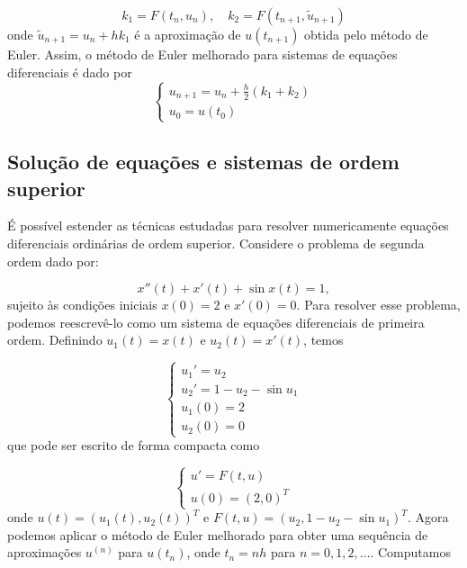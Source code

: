 \documentclass{article}
\begin{document}
\begin{equation}
    k_1 = F(t_n, u_n), \quad k_2 = F(t_{n+1}, \tilde{u}_{n+1})
\end{equation}
onde \(\tilde{u}_{n+1} = u_n + hk_1\) é a aproximação de \(u(t_{n+1})\) obtida pelo método de Euler. Assim, o método de Euler melhorado para sistemas de equações diferenciais é dado por
\begin{equation}
    \begin{cases}
        u_{n+1} = u_n + \frac{h}{2} (k_1 + k_2) \\
        u_0 = u(t_0)
    \end{cases}
\end{equation}

\subsection{Solução de equações e sistemas de ordem superior}

É possível estender as técnicas estudadas para resolver numericamente equações diferenciais ordinárias de ordem superior. Considere o problema de segunda ordem dado por:

\begin{equation}
    x''(t) + x'(t) + \sin x(t) = 1,
\end{equation}
sujeito às condições iniciais \(x(0) = 2\) e \(x'(0) = 0\). Para resolver esse problema, podemos reescrevê-lo como um sistema de equações diferenciais de primeira ordem. Definindo \(u_1(t) = x(t)\) e \(u_2(t) = x'(t)\), temos

\begin{equation}
    \begin{cases}
        u_1' = u_2 \\
        u_2' = 1 - u_2 - \sin u_1 \\
        u_1(0) = 2 \\
        u_2(0) = 0
    \end{cases}
\end{equation}
que pode ser escrito de forma compacta como

\begin{equation}
    \begin{cases}
        u' = F(t, u) \\
        u(0) = (2, 0)^T
    \end{cases}
\end{equation}
onde \(u(t) = (u_1(t), u_2(t))^T\) e \(F(t, u) = (u_2, 1 - u_2 - \sin u_1)^T\). Agora podemos aplicar o método de Euler melhorado para obter uma sequência de aproximações \(u^{(n)}\) para \(u(t_n)\), onde \(t_n = nh\) para \(n = 0, 1, 2, \ldots\). Computamos
\end{document}
